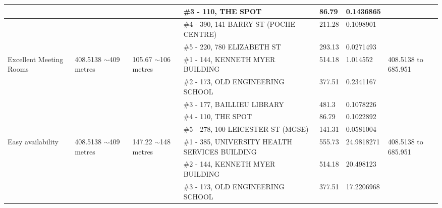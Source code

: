 \begin{table}[H]
{\begin{tabular}{|l|l|l|l|l|l|l|}
                        &                           &                          & \#3 - 110, THE SPOT                                     & 86.79         & 0.1436865       &                           \\ \hline
                        &                           &                          & \#4 - 390, 141 BARRY ST (POCHE CENTRE)                  & 211.28        & 0.1098901       &                           \\ \hline
                        &                           &                          & \#5 - 220, 780 ELIZABETH ST                             & 293.13        & 0.0271493       &                           \\ \hline
Excellent Meeting Rooms & 408.5138 $\sim$409 metres & 105.67 $\sim$106 metres  & \#1 - 144, KENNETH MYER BUILDING                        & 514.18        & 1.014552        & 408.5138 to 685.951       \\ \hline
                        &                           &                          & \#2 - 173, OLD ENGINEERING SCHOOL                       & 377.51        & 0.2341167       &                           \\ \hline
                        &                           &                          & \#3 - 177, BAILLIEU LIBRARY                             & 481.3         & 0.1078226       &                           \\ \hline
                        &                           &                          & \#4 - 110, THE SPOT                                     & 86.79         & 0.1022892       &                           \\ \hline
                        &                           &                          & \#5 - 278, 100 LEICESTER ST (MGSE)                      & 141.31        & 0.0581004       &                           \\ \hline
Easy availability       & 408.5138 $\sim$409 metres & 147.22 $\sim$148 metres  & \#1 - 385, UNIVERSITY HEALTH SERVICES BUILDING          & 555.73        & 24.9818271      & 408.5138 to 685.951       \\ \hline
                        &                           &                          & \#2 - 144, KENNETH MYER BUILDING                        & 514.18        & 20.498123       &                           \\ \hline
                        &                           &                          & \#3 - 173, OLD ENGINEERING SCHOOL                       & 377.51        & 17.2206968      &                           \\ \hline

\end{tabular}}
\end{table}
